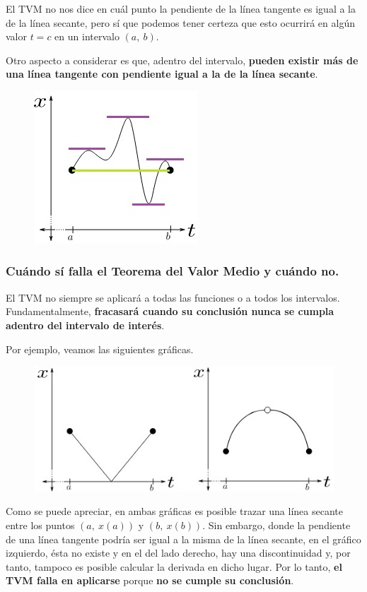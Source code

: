 \documentclass[12pt]{article}
\begin{document}
El TVM no nos dice en cuál punto la pendiente de la línea tangente es igual a la de la línea secante, pero sí que podemos tener certeza que esto ocurrirá en algún valor $t = c$ en un intervalo $(a, \ b)$.

Otro aspecto a considerar es que, adentro del intervalo, \textbf{pueden existir más de una línea tangente con pendiente igual a la de la línea secante}.

\begin{figure}[hbt!]
\centering
\includegraphics[scale=0.7]{img/mean-value-theo-2.jpg}
\end{figure}


\subsubsection{Cuándo sí falla el Teorema del Valor Medio y cuándo no.}

El TVM no siempre se aplicará a todas las funciones o a todos los intervalos. Fundamentalmente, \textbf{fracasará cuando su conclusión nunca se cumpla adentro del intervalo de interés}.

Por ejemplo, veamos las siguientes gráficas.

\begin{figure}[hbt!]
\centering
\includegraphics[scale=0.6]{img/mean-value-theo-3.jpg}
\end{figure}

Como se puede apreciar, en ambas gráficas es posible trazar una línea secante entre los puntos $(a, \ x(a))$ y $(b, \ x(b))$. Sin embargo, donde la pendiente de una línea tangente podría ser igual a la misma de la línea secante, en el gráfico izquierdo, ésta no existe y en el del lado derecho, hay una discontinuidad y, por tanto, tampoco es posible calcular la derivada en dicho lugar. Por lo tanto, \textbf{el TVM falla en aplicarse} porque \textbf{no se cumple su conclusión}.
\end{document}
